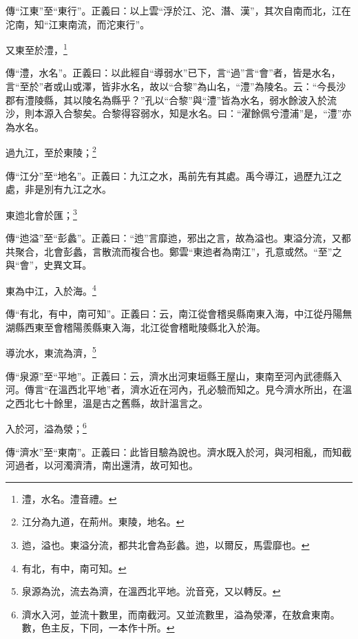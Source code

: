 {\noindent\zhuan{}\fzbyks 傳“江東”至“東行”。正義曰：以上雲“浮於江、沱、潛、漢”，其次自南而北，江在沱南，知“江東南流，而沱東行”。 \par}

又東至於澧，\footnote{澧，水名。澧音禮。}

{\noindent\zhuan{}\fzbyks 傳“澧，水名”。正義曰：以此經自“導弱水”已下，言“過”言“會”者，皆是水名，言“至於”者或山或澤，皆非水名，故以“合黎”為山名，“澧”為陵名。云：“今長沙郡有澧陵縣，其以陵名為縣乎？”孔以“合黎”與“澧”皆為水名，弱水餘波入於流沙，則本源入合黎矣。合黎得容弱水，知是水名。曰：“濯餘佩兮澧浦”是，“澧”亦為水名。 \par}

過九江，至於東陵；\footnote{江分為九道，在荊州。東陵，地名。}

{\noindent\zhuan{}\fzbyks 傳“江分”至“地名”。正義曰：九江之水，禹前先有其處。禹今導江，過歷九江之處，非是別有九江之水。 \par}

東迆北會於匯；\footnote{迆，溢也。東溢分流，都共北會為彭蠡。迆，以爾反，馬雲靡也。}

{\noindent\zhuan{}\fzbyks 傳“迆溢”至“彭蠡”。正義曰：“迆”言靡迆，邪出之言，故為溢也。東溢分流，又都共聚合，北會彭蠡，言散流而複合也。鄭雲“東迆者為南江”，孔意或然。“至”之與“會”，史異文耳。 \par}

東為中江，入於海。\footnote{有北，有中，南可知。}

{\noindent\zhuan{}\fzbyks 傳“有北，有中，南可知”。正義曰：云，南江從會稽吳縣南東入海，中江從丹陽無湖縣西東至會稽陽羨縣東入海，北江從會稽毗陵縣北入於海。 \par}

導沇水，東流為濟，\footnote{泉源為沇，流去為濟，在溫西北平地。沇音兗，又以轉反。}

{\noindent\zhuan{}\fzbyks 傳“泉源”至“平地”。正義曰：云，濟水出河東垣縣王屋山，東南至河內武德縣入河。傳言“在溫西北平地”者，濟水近在河內，孔必驗而知之。見今濟水所出，在溫之西北七十餘里，溫是古之舊縣，故計溫言之。 \par}

入於河，溢為滎；\footnote{濟水入河，並流十數里，而南截河。又並流數里，溢為滎澤，在敖倉東南。數，色主反，下同，一本作十所。}

{\noindent\zhuan{}\fzbyks 傳“濟水”至“東南”。正義曰：此皆目驗為說也。濟水既入於河，與河相亂，而知截河過者，以河濁濟清，南出還清，故可知也。 \par}

